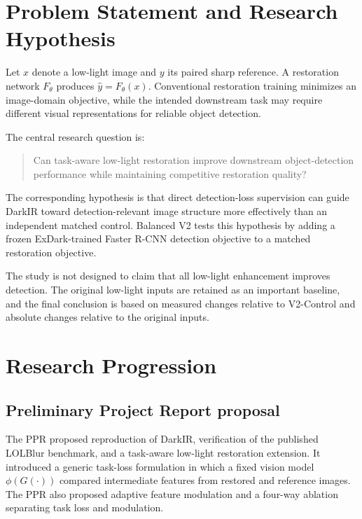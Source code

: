 \section{Problem Statement and Research Hypothesis}
\label{sec:problem}

Let \(x\) denote a low-light image and \(y\) its paired sharp reference.
A restoration network \(F_\theta\) produces
\(\hat y=F_\theta(x)\). Conventional restoration training minimizes an
image-domain objective, while the intended downstream task may require
different visual representations for reliable object detection.

The central research question is:
\begin{quote}
Can task-aware low-light restoration improve downstream object-detection
performance while maintaining competitive restoration quality?
\end{quote}

The corresponding hypothesis is that direct detection-loss supervision
can guide DarkIR toward detection-relevant image structure more effectively
than an independent matched control. Balanced V2 tests this hypothesis by
adding a frozen ExDark-trained Faster R-CNN detection objective to a
matched restoration objective.

The study is not designed to claim that all low-light enhancement improves
detection. The original low-light inputs are retained as an important
baseline, and the final conclusion is based on measured changes relative
to V2-Control and absolute changes relative to the original inputs.

\section{Research Progression}
\label{sec:progression}

\subsection{Preliminary Project Report proposal}

The PPR proposed reproduction of DarkIR, verification of the published
LOLBlur benchmark, and a task-aware low-light restoration extension. It
introduced a generic task-loss formulation in which a fixed vision model
\(\phi(G(\cdot))\) compared intermediate features from restored and
reference images. The PPR also proposed adaptive feature modulation and a
four-way ablation separating task loss and modulation.

